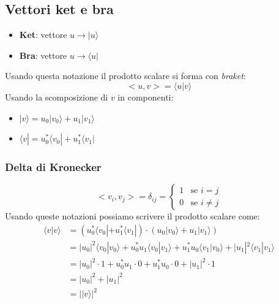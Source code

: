 \documentclass[12pt, a4paper]{report}
\begin{document}
\subsection{Vettori ket e bra}
\begin{itemize}
    \item \textbf{Ket}: vettore $u \rightarrow |u\rangle$
    \item \textbf{Bra}: vettore $u \rightarrow \langle u|$
\end{itemize}
Usando questa notazione il prodotto scalare si forma con \textit{braket}:
\begin{equation*}
    <u,v>=\langle u|v\rangle
\end{equation*}
Usando la scomposizione di $v$ in componenti:
\begin{itemize}
    \item $|v\rangle = u_{0}|v_{0}\rangle + u_{1}|v_{1}\rangle$
    \item $\langle v| = u_{0}^{*}\langle v_{0}| + u_{1}^{*}\langle v_{1}|$
\end{itemize}
\subsubsection{Delta di Kronecker}
\begin{equation*}
    <v_{i},v_{j}> = \delta_{ij} = \begin{cases}
        1 & \text{se } i=j \\
        0 & \text{se } i\neq j
    \end{cases}
\end{equation*}
Usando queste notazioni possiamo scrivere il prodotto scalare come:
\begin{equation*}
    \begin{split}
        \langle v|v\rangle & = (u_{0}^{*}\langle v_{0}| + u_{1}^{*}\langle v_{1}|)\cdot (u_{0}|v_{0}\rangle + u_{1}|v_{1}\rangle) \\
        & = |u_{0}|^{2} \langle v_{0}|v_{0}\rangle + u_{0}^{*}u_{1}\langle v_{0}|v_{1}\rangle + u_{1}^{*}u_{0}\langle v_{1}|v_{0}\rangle + |u_{1}|^{2}\langle v_{1}|v_{1}\rangle \\
        & = |u_{0}|^{2}\cdot 1 + u_{0}^{*}u_{1} \cdot 0 + u_{1}^{*}u_{0} \cdot 0 + |u_{1}|^{2} \cdot 1 \\
        & = |u_{0}|^{2} + |u_{1}|^{2} \\
        & = | |v\rangle |^{2}
    \end{split}
\end{equation*}
\end{document}
